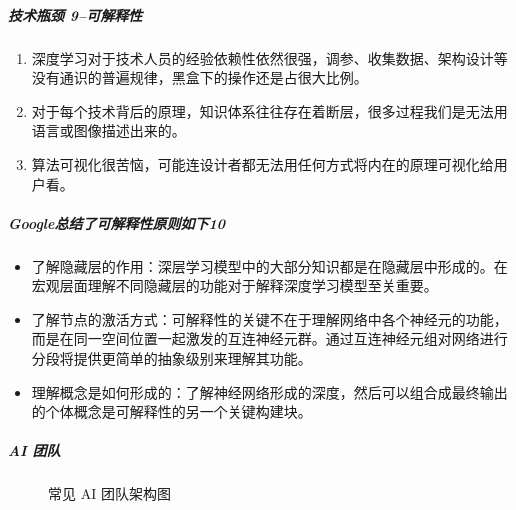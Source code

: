 \documentclass[letterpaper,10pt,english]{sphinxmanual}
\begin{document}
\subparagraph{技术瓶颈 9\sphinxfootnotemark[282]–可解释性}
\label{\detokenize{chapter_introduction/AI_PM:id13}}%
\begin{footnotetext}[282]\sphinxAtStartFootnote
{}
%
\end{footnotetext}\ignorespaces \begin{enumerate}
%
\item {} 
深度学习对于技术人员的经验依赖性依然很强，调参、收集数据、架构设计等没有通识的普遍规律，黑盒下的操作还是占很大比例。

\item {} 
对于每个技术背后的原理，知识体系往往存在着断层，很多过程我们是无法用语言或图像描述出来的。

\item {} 
算法可视化很苦恼，可能连设计者都无法用任何方式将内在的原理可视化给用户看。

\end{enumerate}


\subparagraph{Google总结了可解释性原则如下10\sphinxfootnotemark[283]}
\label{\detokenize{chapter_introduction/AI_PM:google10}}%
\begin{footnotetext}[283]\sphinxAtStartFootnote
{}
%
\end{footnotetext}\ignorespaces \begin{itemize}
\item {} 
了解隐藏层的作用：深层学习模型中的大部分知识都是在隐藏层中形成的。在宏观层面理解不同隐藏层的功能对于解释深度学习模型至关重要。

\item {} 
了解节点的激活方式：可解释性的关键不在于理解网络中各个神经元的功能，而是在同一空间位置一起激发的互连神经元群。通过互连神经元组对网络进行分段将提供更简单的抽象级别来理解其功能。

\item {} 
理解概念是如何形成的：了解神经网络形成的深度，然后可以组合成最终输出的个体概念是可解释性的另一个关键构建块。

\end{itemize}


\subparagraph{AI 团队}
\label{\detokenize{chapter_introduction/AI_PM:id14}}
\begin{figure}[H]
\centering
\capstart

\noindent{}
\caption{常见 AI 团队架构图}\label{\detokenize{chapter_introduction/AI_PM:id54}}\end{figure}
\end{document}
